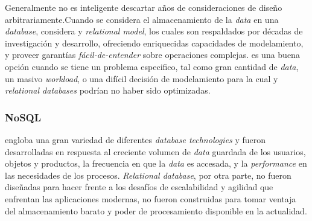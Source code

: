 Generalmente no es inteligente descartar años de consideraciones de diseño arbitrariamente.Cuando se considera el almacenamiento de la \textit{data} en una \textit{database}, considera  y \textit{relational model}, los cuales son respaldados por décadas  de investigación y desarrollo, ofreciendo enriquecidas capacidades de modelamiento, y proveer garantías \textit{fácil-de-entender} sobre operaciones complejas.  es una buena opción cuando se tiene un problema especifico, tal como gran cantidad de \textit{data}, un masivo \textit{workload}, o una difícil decisión de modelamiento para la cual  y \textit{relational databases} podrían no haber sido optimizadas.

\subsubsection{NoSQL}

 engloba una gran variedad de diferentes \textit{database technologies} y fueron desarrolladas en respuesta al creciente volumen de \textit{data} guardada de los usuarios, objetos y productos, la frecuencia en que la \textit{data} es accesada, y la \textit{performance} en las necesidades de los procesos. \textit{Relational database}, por otra parte, no fueron diseñadas para hacer frente a los desafíos de escalabilidad y agilidad que enfrentan las aplicaciones modernas, no fueron construidas para tomar ventaja del almacenamiento barato y poder de procesamiento disponible en la actualidad.

